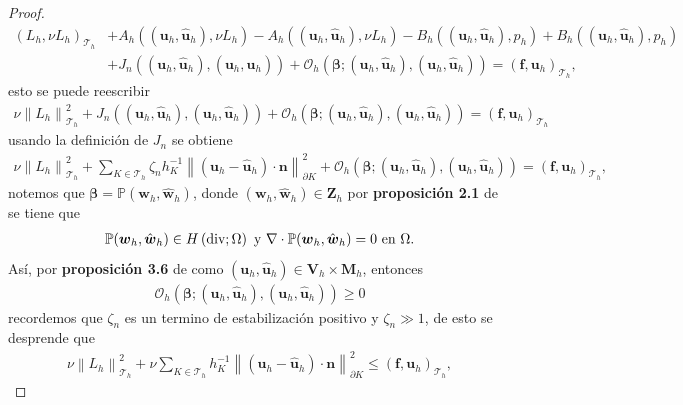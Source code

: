 \documentclass[10pt,a4paper]{report}
\newcommand{\bs}{\boldsymbol}
\newcommand{\Th}{\mathscr{T}_{h}}
\newcommand{\Hdiv}{H\left(\textup{div};\Omega\right)}
\providecommand{\norm}[1]{\left\lVert#1\right\rVert}
\providecommand{\Pii}[2]{\left( #1,#2  \right)}
\begin{document}
\begin{proof}
    \begin{align*}
    	\Pii{L_{h}}{\nu L_{h}}_{\Th} &+ A_{h}\left((\bs{u}_{h},\bs{\hat{u}}_{h}),\nu L_{h}\right) - A_{h}\left((\bs{u}_{h},\bs{\hat{u}}_{h}),\nu L_{h}\right) - B_{h}\left((\bs{u}_{h},\bs{\hat{u}}_{h}),p_{h}\right) + B_{h}\left((\bs{u}_{h},\bs{\hat{u}}_{h}),p_{h}\right)\\ &+ J_{n}\left((\bs{u}_{h},\bs{\hat{u}}_{h}),(\bs{u}_{h},\bs{\hat{u}}_{h})\right) + \mathcal{O}_{h}\left(\bs{\beta}; (\bs{u}_{h},\bs{\hat{u}}_{h}),(\bs{u}_{h},\bs{\hat{u}}_{h})\right) = \Pii{\bs{f}}{\bs{u}_{h}}_{\Th}, 
    \end{align*}
    esto se puede reescribir
    \begin{align*}
    	\nu\norm{L_{h}}^{2}_{\Th} + J_{n}\left((\bs{u}_{h},\bs{\hat{u}}_{h}),(\bs{u}_{h},\bs{\hat{u}}_{h})\right) + \mathcal{O}_{h}\left(\bs{\beta}; (\bs{u}_{h},\bs{\hat{u}}_{h}),(\bs{u}_{h},\bs{\hat{u}}_{h})\right) = \Pii{\bs{f}}{\bs{u}_{h}}_{\Th}
    \end{align*}
    usando la definición de $J_{n}$ se obtiene
    \begin{align*}
    	\nu\norm{L_{h}}^{2}_{\Th} + \sum_{K\in\Th}\zeta_{n}h^{-1}_{K}\norm{(\bs{u}_{h}-\bs{\hat{u}}_{h})\cdot\bs{n}}^{2}_{\partial K} + \mathcal{O}_{h}\left(\bs{\beta}; (\bs{u}_{h},\bs{\hat{u}}_{h}),(\bs{u}_{h},\bs{\hat{u}}_{h})\right) = \Pii{\bs{f}}{\bs{u}_{h}}_{\Th},
    \end{align*}
    notemos que $\bs{\beta} = \mathbb{P}(\bs{w}_{h},\hat{\bs{w}}_{h})$, donde $(\bs{w}_{h},\hat{\bs{w}}_{h})\in \bs{Z}_{h}$ por \textbf{proposición 2.1} de \cite{CAC2017} se tiene que 
    \begin{align*}
    	\mathbb{P}(\bs{w}_{h},\hat{\bs{w}}_{h})\in \Hdiv \ \textup{y}\ \nabla\cdot\mathbb{P}(\bs{w}_{h},\hat{\bs{w}}_{h}) = 0\ \textup{en}\ \Omega.
    \end{align*}
    Así, por \textbf{proposición 3.6} de \cite{CAC2017} como $(\bs{u}_{h},\bs{\hat{u}}_{h})\in \bs{V}_{h}\times\bs{M}_{h}$, entonces
    \begin{align*}
    	\mathcal{O}_{h}\left(\bs{\beta}; (\bs{u}_{h},\bs{\hat{u}}_{h}),(\bs{u}_{h},\bs{\hat{u}}_{h})\right) \geq 0
    \end{align*}
    recordemos que $\zeta_{n}$ es un termino de estabilización positivo y $\zeta_{n}\gg 1$, de esto se desprende que 
    \begin{align*}
    	\nu\norm{L_{h}}^{2}_{\Th} + \nu \sum_{K\in\Th} h^{-1}_{K}\norm{(\bs{u}_{h}-\bs{\hat{u}}_{h})\cdot\bs{n}}^{2}_{\partial K}\leq \Pii{\bs{f}}{\bs{u}_{h}}_{\Th},

\end{align*}
\end{proof}
\end{document}
